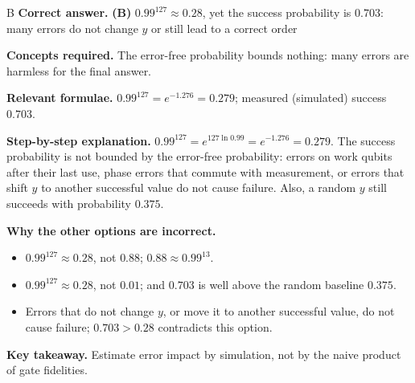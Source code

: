\documentclass[11pt,a4paper]{article}
\newcommand{\qsep}{\par\vspace{2pt}{\color{black!15}\hrule}\vspace{4pt}}
\begin{document}
\begin{solbox}{B}
\textbf{\color{brand}Correct answer.} \textcolor{okgreen}{\textbf{(B)}} $0.99^{127} \approx 0.28$, yet the success probability is $0.703$: many errors do not change $y$ or still lead to a correct order

\textbf{\color{brand}Concepts required.} The error-free probability bounds nothing: many errors are harmless for the final answer.

\textbf{\color{brand}Relevant formulae.} $0.99^{127} = e^{-1.276} = 0.279$; measured (simulated) success $0.703$.

\textbf{\color{brand}Step-by-step explanation.} $0.99^{127} = e^{127\ln0.99} = e^{-1.276} = 0.279$. The success probability is not bounded by the error-free probability: errors on work qubits after their last
use, phase errors that commute with measurement, or errors that shift $y$ to another successful value do not cause failure. Also, a random $y$ still succeeds
with probability $0.375$.

\textbf{\color{brand}Why the other options are incorrect.}
\begin{itemize}[leftmargin=2.4em, itemsep=1pt, topsep=2pt]
\item[\textbf{(A)}] $0.99^{127} \approx 0.28$, not $0.88$; $0.88 \approx 0.99^{13}$.
\item[\textbf{(C)}] $0.99^{127} \approx 0.28$, not $0.01$; and $0.703$ is well above the random baseline $0.375$.
\item[\textbf{(D)}] Errors that do not change $y$, or move it to another successful value, do not cause failure; $0.703 > 0.28$ contradicts this option.
\end{itemize}
\textbf{\color{brand}Key takeaway.} Estimate error impact by simulation, not by the naive product of gate fidelities.
\end{solbox}
\qsep
\end{document}
